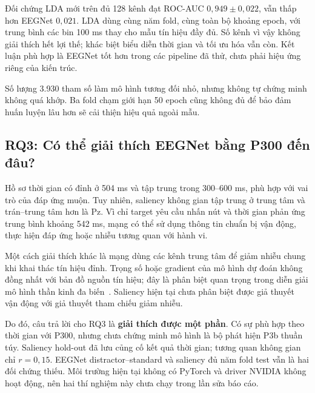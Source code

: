 \documentclass[11pt,a4paper]{article}
\begin{document}
Đối chứng LDA mới trên đủ 128 kênh đạt ROC-AUC $0{,}949\pm0{,}022$, vẫn thấp hơn EEGNet $0{,}021$. LDA dùng cùng năm fold, cùng toàn bộ khoảng epoch, với trung bình các bin 100 ms thay cho mẫu tín hiệu đầy đủ. Số kênh vì vậy không giải thích hết lợi thế; khác biệt biểu diễn thời gian và tối ưu hóa vẫn còn. Kết luận phù hợp là EEGNet tốt hơn trong các pipeline đã thử, chưa phải hiệu ứng riêng của kiến trúc.

Số lượng 3.930 tham số làm mô hình tương đối nhỏ, nhưng không tự chứng minh không quá khớp. Ba fold chạm giới hạn 50 epoch cũng không đủ để bảo đảm huấn luyện lâu hơn sẽ cải thiện hiệu quả ngoài mẫu.

\subsection{RQ3: Có thể giải thích EEGNet bằng P300 đến đâu?}
Hồ sơ thời gian có đỉnh ở 504 ms và tập trung trong 300--600 ms, phù hợp với vai trò của đáp ứng muộn. Tuy nhiên, saliency không gian tập trung ở trung tâm và trán--trung tâm hơn là Pz. Vì chỉ target yêu cầu nhấn nút và thời gian phản ứng trung bình khoảng 542 ms, mạng có thể sử dụng thông tin chuẩn bị vận động, thực hiện đáp ứng hoặc nhiễu tương quan với hành vi.

Một cách giải thích khác là mạng dùng các kênh trung tâm để giảm nhiễu chung khi khai thác tín hiệu đỉnh. Trọng số hoặc gradient của mô hình dự đoán không đồng nhất với bản đồ nguồn tín hiệu; đây là phân biệt quan trọng trong diễn giải mô hình thần kinh đa biến~\cite{haufe}. Saliency hiện tại chưa phân biệt được giả thuyết vận động với giả thuyết tham chiếu giảm nhiễu.

Do đó, câu trả lời cho RQ3 là \textbf{giải thích được một phần}. Có sự phù hợp theo thời gian với P300, nhưng chưa chứng minh mô hình là bộ phát hiện P3b thuần túy. Saliency hold-out đã lưu củng cố kết quả thời gian; tương quan không gian chỉ $r=0{,}15$. EEGNet distractor--standard và saliency đủ năm fold test vẫn là hai đối chứng thiếu. Môi trường hiện tại không có PyTorch và driver NVIDIA không hoạt động, nên hai thí nghiệm này chưa chạy trong lần sửa báo cáo.
\end{document}
